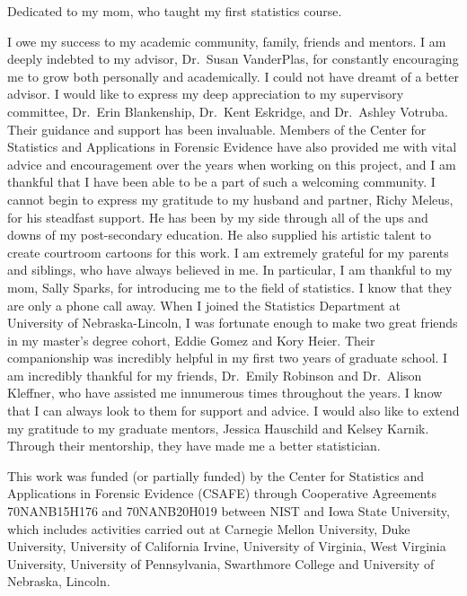 \documentclass[print]{nuthesis}
\begin{document}
\begin{dedication}
Dedicated to my mom, who taught my first statistics course.
\end{dedication}

\begin{acknowledgments}
I owe my success to my academic community, family, friends and mentors.
I am deeply indebted to my advisor, Dr.~Susan VanderPlas, for constantly encouraging me to grow both personally and academically. I could not have dreamt of a better advisor.
I would like to express my deep appreciation to my supervisory committee, Dr.~Erin Blankenship, Dr.~Kent Eskridge, and Dr.~Ashley Votruba. Their guidance and support has been invaluable.
Members of the Center for Statistics and Applications in Forensic Evidence have also provided me with vital advice and encouragement over the years when working on this project, and I am thankful that I have been able to be a part of such a welcoming community.
I cannot begin to express my gratitude to my husband and partner, Richy Meleus, for his steadfast support. He has been by my side through all of the ups and downs of my post-secondary education. He also supplied his artistic talent to create courtroom cartoons for this work.
I am extremely grateful for my parents and siblings, who have always believed in me. In particular, I am thankful to my mom, Sally Sparks, for introducing me to the field of statistics. I know that they are only a phone call away.
When I joined the Statistics Department at University of Nebraska-Lincoln, I was fortunate enough to make two great friends in my master's degree cohort, Eddie Gomez and Kory Heier. Their companionship was incredibly helpful in my first two years of graduate school.
I am incredibly thankful for my friends, Dr.~Emily Robinson and Dr.~Alison Kleffner, who have assisted me innumerous times throughout the years. I know that I can always look to them for support and advice.
I would also like to extend my gratitude to my graduate mentors, Jessica Hauschild and Kelsey Karnik. Through their mentorship, they have made me a better statistician.

This work was funded (or partially funded) by the Center for Statistics and Applications in Forensic Evidence (CSAFE) through Cooperative Agreements 70NANB15H176 and 70NANB20H019 between NIST and Iowa State University, which includes activities carried out at Carnegie Mellon University, Duke University, University of California Irvine, University of Virginia, West Virginia University, University of Pennsylvania, Swarthmore College and University of Nebraska, Lincoln.
\end{acknowledgments}
\end{document}
